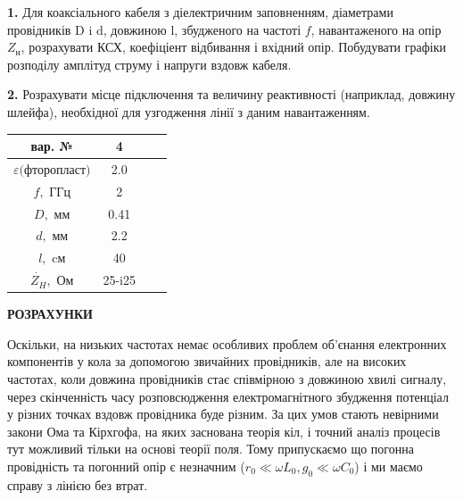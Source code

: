 \documentclass[a4paper,14pt]{extreport}
\begin{document}
\textbf{1.} Для коаксіального кабеля з діелектричним заповненням, діаметрами провідників D i d, довжиною l, збудженого на частоті $f$, навантаженого на опір $Z_\text{н}$, розрахувати КСХ, коефіціент відбивання і вхідний опір. Побудувати графіки розподілу амплітуд струму і напруги вздовж кабеля.\par

\textbf{2.} Розрахувати місце підключення та величину реактивності (наприклад, довжину шлейфа), необхідної для узгодження лінії з даним навантаженням.\\


\begin{center}
\vspace{0.1cm}

\begin{tabular}{ | c |  c |  c |  c |}
\hline
вар. № & 4   \\
\hline
$\varepsilon \text{(фторопласт)}$ & 2.0   \\
\hline
$f, $ ГГц& 2   \\
\hline
$D, $ мм&  0.41  \\
\hline
$d, $ мм&  2.2  \\
\hline
$l, $ cм& 40   \\
\hline
$\dot{Z_{H}}, $ Ом & 25-i25   \\
\hline
\end{tabular}
\vspace{0.2cm}
\end{center}




\newpage
\begin{center}
\textbf{РОЗРАХУНКИ} \\
\end{center}

Оскільки, на низьких частотах немає особливих проблем об'єнання електронних компонентів у кола за допомогою звичайних провідників, але на високих частотах, коли довжина провідників стає співмірною з довжиною хвилі сигналу, через скінченність часу розповсюдження електромагнітного збудження потенціал у різних точках вздовж провідника буде різним. За цих умов стають невірними закони Ома та Кірхгофа, на яких заснована теорія кіл, і точний аналіз процесів тут можливий тільки на основі теорії поля. Тому припускаємо що погонна провідність та погонний опір є незначним ($r_{0}\ll\omega L_{0} , g_{0}\ll\omega C_{0}$) і ми маємо справу з лінією без втрат. \par
\end{document}

